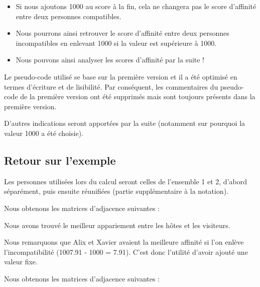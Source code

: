 \documentclass{mytex}
\begin{document}
\begin{itemize}
    \item Si nous ajoutons 1000 au score à la fin, cela ne changera pas le score d'affinité entre deux personnes compatibles.
    \item Nous pourrons ainsi retrouver le score d'affinité entre deux personnes incompatibles en enlevant 1000 si la valeur est supérieure à 1000.
    \item Nous pouvons ainsi analyser les scores d'affinité par la suite !
\end{itemize}

Le pseudo-code utilisé se base sur la première version et il a été optimisé en termes d'écriture et de lisibilité.
Par conséquent, les commentaires du pseudo-code de la première version ont été supprimés mais sont toujours présents dans la première version.

D'autres indications seront apportées par la suite (notamment sur pourquoi la valeur 1000 a été choisie).

\subsection{Retour sur l'exemple}

Les personnes utilisées lors du calcul seront celles de l'ensemble 1 et 2, d'abord séparément, puis ensuite réunifiées (partie supplémentaire à la notation).

Nous obtenons les matrices d'adjacence suivantes :



Nous avons trouvé le meilleur appariement entre les hôtes et les visiteurs.



Nous remarquons que Alix et Xavier avaient la meilleure affinité si l'on enlève l'incompatibilité (1007.91 - 1000 = 7.91).
C'est donc l'utilité d'avoir ajouté une valeur fixe.


Nous obtenons les matrices d'adjacence suivantes : 

\end{document}
